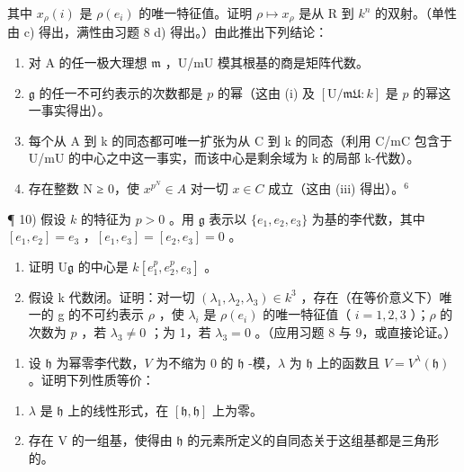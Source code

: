 其中 \(x_{\rho}(i)\) 是 \(\rho(e_{i})\) 的唯一特征值。证明 \(\rho \mapsto x_{\rho}\) 是从 R 到 \(k^{n}\) 的双射。（单性由 c) 得出，满性由习题 8 d) 得出。）由此推出下列结论：

\begin{enumerate}
\def\labelenumi{(\roman{enumi})}
\item
  对 A 的任一极大理想 \(\mathfrak{m}\) ，U/mU 模其根基的商是矩阵代数。
\item
  \(\mathfrak{g}\) 的任一不可约表示的次数都是 \(p\) 的幂（这由 (i) 及 \([\mathrm{U} / \mathfrak{mU}:k]\) 是 \(p\) 的幂这一事实得出）。
\item
  每个从 A 到 k 的同态都可唯一扩张为从 C 到 k 的同态（利用 C/mC 包含于 U/mU 的中心之中这一事实，而该中心是剩余域为 k 的局部 k-代数）。
\item
  存在整数 N ≥ 0，使 \(x^{p^{N}} \in A\) 对一切 \(x \in C\) 成立（这由 (iii) 得出）。\(^{6}\)
\end{enumerate}

¶ 10) 假设 \(k\) 的特征为 \(p > 0\) 。用 \(\mathfrak{g}\) 表示以 \(\{e_1, e_2, e_3\}\) 为基的李代数，其中 \([e_1, e_2] = e_3\) ，\([e_1, e_3] = [e_2, e_3] = 0\) 。

\begin{enumerate}
\def\labelenumi{\alph{enumi})}
\item
  证明 \(\mathrm{U}\mathfrak{g}\) 的中心是 \(k[e_1^p,e_2^p,e_3]\) 。
\item
  假设 k 代数闭。证明：对一切 \((\lambda_{1},\lambda_{2},\lambda_{3})\in k^{3}\) ，存在（在等价意义下）唯一的 g 的不可约表示 \(\rho\) ，使 \(\lambda_{i}\) 是 \(\rho(e_i)\) 的唯一特征值（ \(i = 1,2,3\) ）；\(\rho\) 的次数为 \(p\) ，若 \(\lambda_3 \neq 0\) ；为 1，若 \(\lambda_3 = 0\) 。（应用习题 8 与 9，或直接论证。）
\end{enumerate}

\begin{enumerate}
\def\labelenumi{\arabic{enumi})}
\setcounter{enumi}{10}
\tightlist
\item
  设 \(\mathfrak{h}\) 为幂零李代数，\(V\) 为不缩为 0 的 \(\mathfrak{h}\) -模，\(\lambda\) 为 \(\mathfrak{h}\) 上的函数且 \(V = V^{\lambda}(\mathfrak{h})\) 。证明下列性质等价：
\end{enumerate}

\begin{enumerate}
\def\labelenumi{(\roman{enumi})}
\item
  \(\lambda\) 是 \(\mathfrak{h}\) 上的线性形式，在 \([\mathfrak{h},\mathfrak{h}]\) 上为零。
\item
  存在 \(\mathrm{V}\) 的一组基，使得由 \(\mathfrak{h}\) 的元素所定义的自同态关于这组基都是三角形的。
\end{enumerate}

